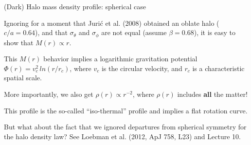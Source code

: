\documentclass[letterpaper,landscape]{slides}
\begin{document}
\begin{slide}
\begin{center}
{\large \color{red} 
                     (Dark) Halo mass density profile: spherical case  }
\end{center}

 Ignoring for a moment that Juri\'{c} et al. (2008) obtained an oblate halo ($c/a=0.64$), and that
$\sigma_\theta$ and $\sigma_\phi$ are not equal (assume $\beta=0.68$),  it is easy to show that 
{\color{blue} $M(r) \propto r$.}

This $M(r)$ behavior implies a logarithmic gravitation potential $\Phi(r) = v_c^2 \, ln(r/r_c)$, where
$v_c$ is the circular velocity, and $r_c$ is a characteristic spatial scale. 

More importantly,
we also get $\rho(r) \propto r^{-2}$, where $\rho(r)$ includes {\bf all} the matter! 

This profile is the so-called ``iso-thermal'' profile and implies a flat rotation curve. 

{\color{blue} But what about the fact that we ignored departures from spherical 
symmetry for the halo density law?}  See Loebman et al. (2012, ApJ 758, L23)
and Lecture 10. 


\vfill
\end{slide}



\end{document}
